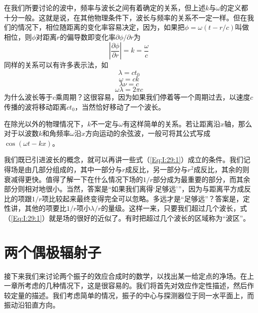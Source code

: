 在我们所要讨论的波中，频率与波长之间有着确定的关系，但上述$k$与$\omega$的定义都十分一般。这就是说，在其他物理条件下，波长与频率的关系不一定一样。但在我们的情况下，相位随距离的变化率容易决定，因为，如果把$\phi = \omega (t-r/c)$叫做相位，则$\phi $对距离$r$的偏导数即变化率$\partial\phi/\partial r$为
\begin{equation}
    \label{Eq:I:29:4}
    \left\lvert \frac{\partial\phi}{\partial r} \right\rvert = k = \frac{\omega}{c}
\end{equation}
同样的关系可以有许多表示法，如
\begin{equation}
    \label{Eq:I:29:5}
    \lambda=ct_0
\end{equation}
\begin{equation}
    \label{Eq:I:29:6}
    \omega=ck
\end{equation}
\begin{equation}
    \label{Eq:I:29:7}
    \lambda\nu=c
\end{equation}
\begin{equation}
    \label{Eq:I:29:8}
    \omega\lambda=2\pi c
\end{equation}
为什么波长等于$c$乘周期？这很容易，因为如果我们停着等一个周期过去，以速度$c$传播的波将移动距离$ct_0$，当然恰好移动了一个波长。

在除光以外的物理情况下，$k$不一定与$\omega$有这样简单的关系。若让距离沿$x$轴，那么对于以波数$k$和角频率$\omega$沿$x$方向运动的余弦波，一般可将其公式写成$\cos(\omega t-kx)$。

我们既已引进波长的概念，就可以再讲一些式（\ref{Eq:I:29:1}）成立的条件。我们记得场是由几部分组成的，其中一部分与$r$成反比，另一部分与$r^2$成反比，其余的则衰减得更快。值得了解一下在什么情况下场的$1/r$部分成为最重要的部分，而其余部分则相对地很小。当然，答案是“如果我们离得‘足够远’”，因为与距离平方成反比的项跟$1/r$项比较起来最终变得完全可以忽略。多远才是“足够远”？答案是，定性讲，其他的项要比$1/r$项小$\lambda/r$的量级。这样一来，只要我们超过几个波长，式（\ref{Eq:I:29:1}）就是场的很好的近似了。有时把超过几个波长的区域称为“波区”。

\section{两个偶极辐射子}

接下来我们来讨论两个振子的效应合成时的数学，以找出某一给定点的净场。在上一章所考虑的几种情况下，这是很容易的。我们将首先对效应作定性描述，然后作较定量的描述。我们考虑简单的情况，振子的中心与探测器位于同一水平面上，而振动沿铅直方向。

